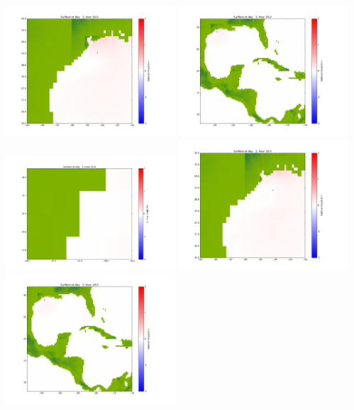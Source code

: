 \documentclass[11pt]{article}
\begin{document}
\includegraphics[width=0.475\textwidth]{frame0068fig1002.png}
\vskip 10pt 
\includegraphics[width=0.475\textwidth]{frame0068fig1003.png}
\vskip 10pt 
\includegraphics[width=0.475\textwidth]{frame0069fig1001.png}
\includegraphics[width=0.475\textwidth]{frame0069fig1002.png}
\vskip 10pt 
\includegraphics[width=0.475\textwidth]{frame0069fig1003.png}
\end{document}
